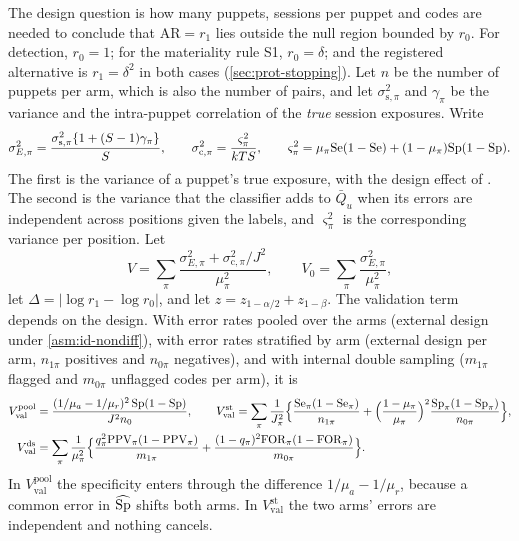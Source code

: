 The design question is how many puppets, sessions per puppet and codes are needed to conclude that $\mathrm{AR}=r_1$ lies outside the null region bounded by $r_0$. For detection, $r_0=1$; for the materiality rule S1, $r_0=\delta$; and the registered alternative is $r_1=\delta^2$ in both cases (\cref{sec:prot-stopping}). Let $n$ be the number of puppets per arm, which is also the number of pairs, and let $\sigma^2_{\mathrm s,\pi}$ and $\gamma_\pi$ be the variance and the intra-puppet correlation of the \emph{true} session exposures. Write
\begin{equation}\label{eq:pw-var}
  \sigma^2_{E,\pi}=\frac{\sigma^2_{\mathrm s,\pi}\{1+(S-1)\gamma_\pi\}}{S},\qquad
  \sigma^2_{\mathrm c,\pi}=\frac{\varsigma^2_\pi}{kTS},\qquad
  \varsigma^2_\pi=\mu_\pi\mathrm{Se}(1-\mathrm{Se})+(1-\mu_\pi)\mathrm{Sp}(1-\mathrm{Sp}).
\end{equation}
The first is the variance of a puppet's true exposure, with the design effect of \citet{kish1965}. The second is the variance that the classifier adds to $\bar Q_u$ when its errors are independent across positions given the labels, and $\varsigma^2_\pi$ is the corresponding variance per position. Let
\[
  V=\sum_\pi\frac{\sigma^2_{E,\pi}+\sigma^2_{\mathrm c,\pi}/J^2}{\mu_\pi^2},\qquad
  V_0=\sum_\pi\frac{\sigma^2_{E,\pi}}{\mu_\pi^2},
\]
let $\Delta=|\log r_1-\log r_0|$, and let $z=z_{1-\alpha/2}+z_{1-\beta}$. The validation term depends on the design. With error rates pooled over the arms (external design under \cref{asm:id-nondiff}), with error rates stratified by arm (external design per arm, $n_{1\pi}$ positives and $n_{0\pi}$ negatives), and with internal double sampling ($m_{1\pi}$ flagged and $m_{0\pi}$ unflagged codes per arm), it is
\begin{equation}\label{eq:pw-B}
\begin{aligned}
  V_{\mathrm{val}}^{\mathrm{pool}}&=\frac{(1/\mu_a-1/\mu_r)^2\,\mathrm{Sp}(1-\mathrm{Sp})}{J^2n_0},\qquad
  V_{\mathrm{val}}^{\mathrm{st}}=\sum_\pi\frac{1}{J_\pi^2}\Bigl\{\frac{\mathrm{Se}_\pi(1-\mathrm{Se}_\pi)}{n_{1\pi}}+\Bigl(\frac{1-\mu_\pi}{\mu_\pi}\Bigr)^2\frac{\mathrm{Sp}_\pi(1-\mathrm{Sp}_\pi)}{n_{0\pi}}\Bigr\},\\
  V_{\mathrm{val}}^{\mathrm{ds}}&=\sum_\pi\frac{1}{\mu_\pi^2}\Bigl\{\frac{q_\pi^2\mathrm{PPV}_\pi(1-\mathrm{PPV}_\pi)}{m_{1\pi}}+\frac{(1-q_\pi)^2\mathrm{FOR}_\pi(1-\mathrm{FOR}_\pi)}{m_{0\pi}}\Bigr\}.
\end{aligned}
\end{equation}
In $V_{\mathrm{val}}^{\mathrm{pool}}$ the specificity enters through the difference $1/\mu_a-1/\mu_r$, because a common error in $\widehat{\mathrm{Sp}}$ shifts both arms. In $V_{\mathrm{val}}^{\mathrm{st}}$ the two arms' errors are independent and nothing cancels.

